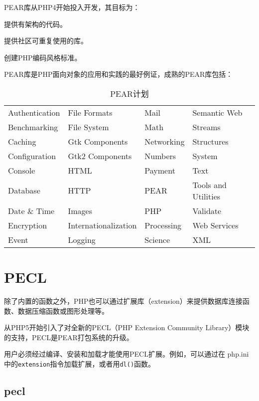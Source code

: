 PEAR库从PHP4开始投入开发，其目标为：

\begin{compactitem}
\item 提供有架构的代码。
\item 提供社区可重复使用的库。
\item 创建PHP编码风格标准。
\end{compactitem}

PEAR库是PHP面向对象的应用和实践的最好例证，成熟的PEAR库包括：

\begin{table}[!ht]
\centering
\caption{PEAR计划}
\label{php_pear}
\begin{tabular}{llll}
Authentication	&File Formats		&Mail			&Semantic Web\\
Benchmarking	&File System		&Math			&Streams\\
Caching			&Gtk Components	&Networking	&Structures\\
Configuration	&Gtk2 Components	&Numbers		&System\\
Console			&HTML				&Payment		&Text\\
Database		&HTTP				&PEAR			&Tools and Utilities\\
Date \& Time	&Images			&PHP			&Validate\\
Encryption		&Internationalization&Processing	&Web Services\\
Event			&Logging			&Science		&XML\\
\end{tabular}
\end{table}



\section{PECL}



除了内置的函数之外，PHP也可以通过扩展库（extension）来提供数据库连接函数、数据压缩函数或图形处理等。


从PHP5开始引入了对全新的PECL（PHP Extension Community Library）模块的支持，PECL是PEAR打包系统的升级。

用户必须经过编译、安装和加载才能使用PECL扩展。例如，可以通过在 php.ini中的\texttt{extension}指令加载扩展，或者用\texttt{dl()}函数。

\subsection{pecl}


